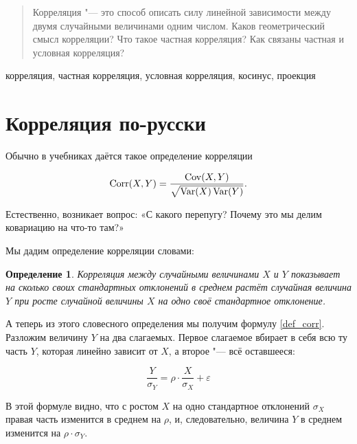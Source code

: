 \documentclass[10pt]{article}
\begin{document}


\DoFirstPageTechnicalStuff


\newtheorem{theorem}{Теорема}
\newtheorem{definition}{Определение}

\begin{abstract}
Корреляция "--- это способ описать силу линейной зависимости между двумя случайными величинами одним числом. Каков геометрический смысл корреляции? Что такое частная корреляция? Как связаны частная и условная корреляция? 
\end{abstract}

\begin{keyword}
корреляция, частная корреляция, условная корреляция, косинус, проекция
\end{keyword}



\section{Корреляция по-русски}

Обычно в учебниках даётся такое определение корреляции

\begin{equation}
\label{def_corr}
\operatorname{Corr}(X,Y)=\frac{\operatorname{Cov}(X,Y)}{\sqrt{\operatorname{Var}(X)\operatorname{Var}(Y)}}.
\end{equation}

Естественно, возникает вопрос: «С какого перепугу? Почему это мы делим ковариацию на что-то там?»

Мы дадим определение корреляции словами:

\begin{definition}
Корреляция между случайными величинами $X$ и $Y$ показывает на сколько своих стандартных отклонений в среднем растёт случайная величина $Y$ при росте случайной величины $X$ на одно своё стандартное отклонение.
\end{definition}

А теперь из этого словесного определения мы получим формулу \ref{def_corr}. Разложим величину $Y$ на два слагаемых. Первое слагаемое вбирает в себя всю ту часть $Y$, которая линейно зависит от $X$, а второе "--- всё оставшееся:

\[
\frac{Y}{\sigma_Y}=\rho \cdot \frac{X}{\sigma_X} + \varepsilon
\]

В этой формуле видно, что с ростом $X$ на одно стандартное отклонений $\sigma_X$ правая часть изменится в среднем на $\rho$, и, следовательно, величина $Y$ в среднем изменится на $\rho \cdot \sigma_Y$. 
\end{document}
